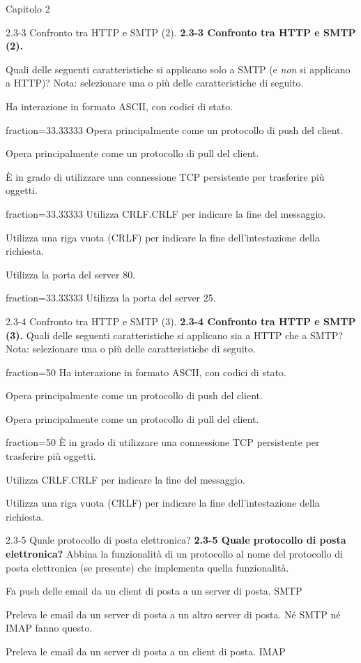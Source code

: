 \documentclass[11pt]{article}
\begin{document}
\begin{quiz}{Capitolo 2}
\begin{multi}[points=1,shuffle,multiple]{2.3-3 Confronto tra HTTP e SMTP (2).}
\textbf{2.3-3 Confronto tra HTTP e SMTP (2).} 

Quali delle seguenti caratteristiche si applicano solo a SMTP (e \emph{non} si applicano a HTTP)?  
Nota: selezionare una o più delle caratteristiche di seguito.

\item Ha interazione in formato ASCII, con codici di stato.
\item[fraction=33.33333] Opera principalmente come un protocollo di push del client.
\item Opera principalmente come un protocollo di pull del client.
\item È in grado di utilizzare una connessione TCP persistente per trasferire più oggetti.
\item[fraction=33.33333] Utilizza CRLF.CRLF per indicare la fine del messaggio.
\item Utilizza una riga vuota (CRLF) per indicare la fine dell'intestazione della richiesta.
\item Utilizza la porta del server 80.
\item[fraction=33.33333] Utilizza la porta del server 25.
\end{multi}
    

\begin{multi}[points=1,shuffle,multiple]{2.3-4 Confronto tra HTTP e SMTP (3).}
\textbf{2.3-4 Confronto tra HTTP e SMTP (3).} 
Quali delle seguenti caratteristiche si applicano sia a HTTP che a SMTP? 
Nota: selezionare una o più delle caratteristiche di seguito.

\item[fraction=50] Ha interazione in formato ASCII, con codici di stato.
\item Opera principalmente come un protocollo di push del client.
\item Opera principalmente come un protocollo di pull del client.
\item[fraction=50] È in grado di utilizzare una connessione TCP persistente per trasferire più oggetti.
\item Utilizza CRLF.CRLF per indicare la fine del messaggio.
\item Utilizza una riga vuota (CRLF) per indicare la fine dell'intestazione della richiesta.
\end{multi}

\begin{matching}[points=1,shuffle]{2.3-5 Quale protocollo di posta elettronica?}
\textbf{2.3-5 Quale protocollo di posta elettronica?}  
Abbina la funzionalità di un protocollo al nome del protocollo di posta elettronica (se presente) che implementa quella funzionalità.
\item Fa push delle email da un client di posta a un server di posta. \answer SMTP
\item Preleva le email da un server di posta a un altro server di posta. \answer Né SMTP né IMAP fanno questo.
\item Preleva le email da un server di posta a un client di posta. \answer IMAP
\end{matching}
    

\end{quiz}
\end{document}
